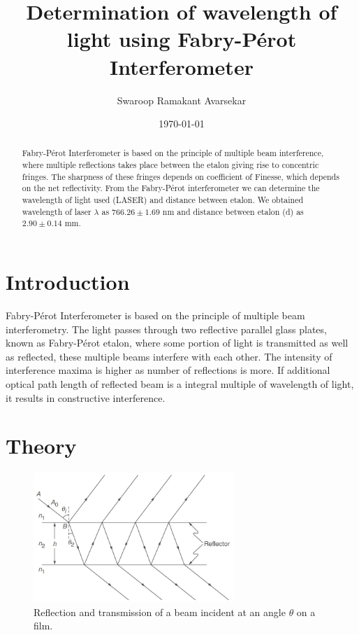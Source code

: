 \documentclass[a4paper, amsfonts, amssymb, amsmath, reprint, showkeys, nofootinbib, twoside]{revtex4-1}
\begin{document}
\title{Determination of wavelength of light using Fabry-Pérot Interferometer}
\author{Swaroop Ramakant Avarsekar}
\date{\today}


	
\begin{abstract}
Fabry-Pérot Interferometer is based on the principle of multiple beam interference, where multiple reflections takes place between the etalon giving rise to concentric fringes. The sharpness of these fringes depends on coefficient of Finesse, which depends on the net reflectivity. From the Fabry-Pérot interferometer we can determine the wavelength of light used (LASER) and distance between etalon. We obtained wavelength of laser $\lambda$ as $766.26\pm1.69$ nm and distance between etalon (d) as $2.90\pm 0.14$ mm.
\end{abstract}
	
	
\maketitle

\section{Introduction}
Fabry-Pérot Interferometer is based on the principle of multiple beam interferometry. The light passes through two reflective parallel glass plates, known as Fabry-Pérot etalon, where some portion of light is transmitted as well as reflected, these multiple beams interfere with each other. The intensity of interference maxima is higher as number of reflections is more. If additional optical path length of reflected beam is a integral multiple of wavelength of light, it results in constructive interference.

\section{Theory}
\begin{figure}[htbp] %
   \centering
   \includegraphics[width=3in]{1} 
   \caption{Reflection and transmission of a beam incident at an angle $\theta$ on a film.}
   \label{1}
\end{figure}
\end{document}
